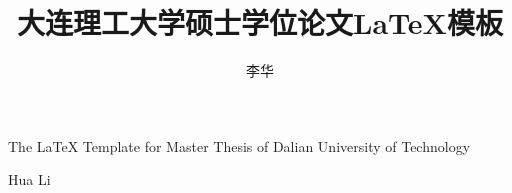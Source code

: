 \title{大连理工大学硕士学位论文{\LaTeX}模板}{The {\LaTeX} Template for Master Thesis of Dalian University of Technology}
\author{李华}{Hua Li}
